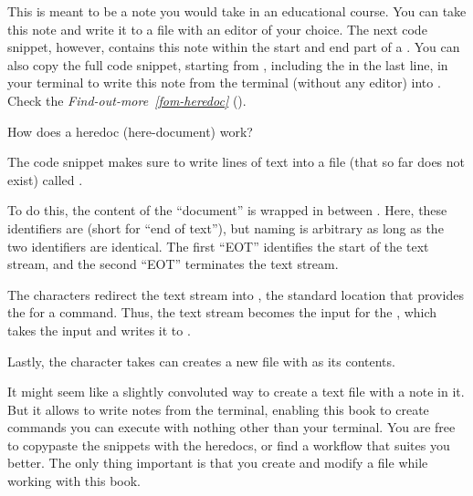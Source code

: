 \sphinxAtStartPar
This is meant to be a note you would take in an educational course.
You can take this note and write it to a file with an editor of your choice.
The next code snippet, however, contains this note within the start and end part of a
.
You can also copy the full code snippet, starting
from , including the  in the last line, in your
terminal to write this note from the terminal (without any editor) into .
Check the \textit{Find-out-more}~{\findoutmoreiconinline}\textit{\ref{fom-heredoc}} {\hyperref[\detokenize{basics/101-103-modify:fom-heredoc}]{}} ().

\ignorespaces \begin{findoutmore}[label={fom-heredoc}, before title={\thetcbcounter\ }, float, floatplacement=tb, check odd page=true]{How does a heredoc (here-document) work?}
\label{\detokenize{basics/101-103-modify:fom-heredoc}}

\sphinxAtStartPar
The code snippet makes sure to write lines of text into a
file (that so far does not exist) called .

\sphinxAtStartPar
To do this, the content of the “document” is wrapped in between
. Here, these identifiers are  (short
for “end of text”), but naming is arbitrary as long as the two identifiers
are identical. The first “EOT” identifies the start of the text stream, and
the second “EOT” terminates the text stream.

\sphinxAtStartPar
The characters \sphinxcode{\sphinxupquote{\textless{}\textless{}}} redirect the text stream into
,
the standard location that provides the  for a command.
Thus, the text stream becomes the input for the
, which takes
the input and writes it to
.

\sphinxAtStartPar
Lastly, the \sphinxcode{\sphinxupquote{\textgreater{}}} character takes  can creates a new file
 with  as its contents.

\sphinxAtStartPar
It might seem like a slightly convoluted way to create a text file with
a note in it. But it allows to write notes from the terminal, enabling
this book to create commands you can execute with nothing other than your terminal.
You are free to copy\sphinxhyphen{}paste the snippets with the heredocs,
or find a workflow that suites you better. The only thing important is that
you create and modify a  file while working with this book.


\end{findoutmore}


